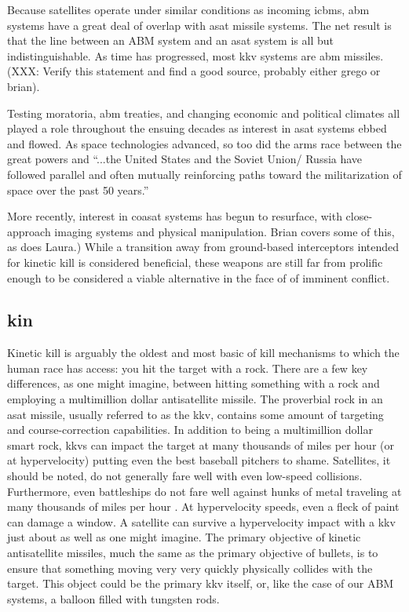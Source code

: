 Because satellites operate under similar conditions as incoming
\acp{icbm}, \ac{abm} systems have a great deal of overlap with
\ac{asat} missile systems.  The net result is that the line between an
ABM system and an \ac{asat} system is all but indistinguishable.  As
time has progressed, most \ac{kkv} systems are \ac{abm} missiles.(XXX:
Verify this statement and find a good source, probably either grego or
brian).

Testing moratoria, \ac{abm} treaties, and changing economic and
political climates all played a role throughout the ensuing decades as
interest in \ac{asat} systems ebbed and
flowed.\cite[XXX]{grego} As space technologies advanced, so too
did the arms race between the great powers and ``...the United States
and the Soviet Union/ Russia have followed parallel and often mutually
reinforcing paths toward the militarization of space over the past 50
years.''\cite[2]{grego}

More recently, interest in \ac{coasat} systems has begun to resurface,
with close-approach imaging systems \cite[the russian one maybe?]{xxx}
and physical manipulation.\cite[chinese one maybe?]{xxx} Brian covers
some of this, as does Laura.)  While a transition away from
ground-based interceptors intended for kinetic kill is considered
beneficial, these weapons are still far from prolific enough to be
considered a viable alternative in the face of of imminent conflict.

\subsection{\acf{kin}}

Kinetic kill is arguably the oldest and most basic of kill mechanisms
to which the human race has access: you hit the target with a
rock.\cite[needed?]{xxx} There are a few key differences, as one might
imagine, between hitting something with a rock and employing a
multimillion dollar antisatellite missile.  The proverbial rock in an
\ac{asat} missile, usually referred to as the \acf{kkv}, contains some
amount of targeting and course-correction capabilities.\cite{sm3} In
addition to being a multimillion dollar smart rock, \acp{kkv} can
impact the target at many thousands of miles per hour (or at
hypervelocity) putting even the best baseball pitchers to
shame.\cite[kkv impact simulation]{xxx} Satellites, it should be
noted, do not generally fare well with even low-speed
collisions.\cite{whoopsies} Furthermore, even battleships do not fare
well against hunks of metal traveling at many thousands of miles per
hour \cite[any hypersonic paper]{xxx}.  At hypervelocity speeds, even
a fleck of paint can damage a window.\cite[iss window]{xxx} A
satellite can survive a hypervelocity impact with a \ac{kkv} just
about as well as one might imagine.\cite[hypervelocity impact
  simulation]{xxx} The primary objective of kinetic antisatellite
missiles, much the same as the primary objective of bullets, is to
ensure that something moving very very quickly physically collides
with the target.\cite[needed?]{xxx} This object could be the primary
\ac{kkv} itself, or, like the case of our ABM systems, a balloon
filled with tungsten rods.\cite[dig that one up or get rid of it]{xxx}

